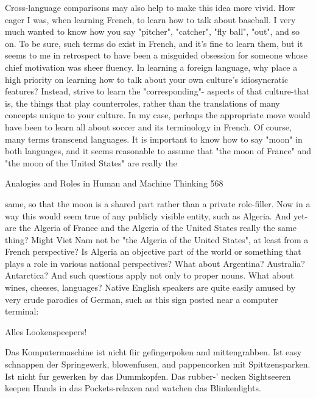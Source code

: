        Cross-language comparisons may also help to make this idea more vivid. How
eager I was, when learning French, to learn how to talk about baseball. I very much
wanted to know how you say "pitcher", "catcher", "fly ball", "out", and so on. To be
sure, such terms do exist in French, and it's fine to learn them, but it seems to me in
retrospect to have been a misguided obsession for someone whose chief motivation
was sheer fluency. In learning a foreign language, why place a high priority on
learning how to talk about your own culture's idiosyncratic features? Instead, strive to
learn the "corresponding"- aspects of that culture-that is, the things that play
counterroles, rather than the translations of many concepts unique to your culture. In
my case, perhaps the appropriate move would have been to learn all about soccer and
its terminology in French.
        Of course, many terms transcend languages. It is important to know how to
say "moon" in both languages, and it seems reasonable to assume that "the moon of
France" and "the moon of the United States" are really the




Analogies and Roles in Human and Machine Thinking                                      568

same, so that the moon is a shared part rather than a private role-filler. Now in a way
this would seem true of any publicly visible entity, such as Algeria. And yet-are the
Algeria of France and the Algeria of the United States really the same thing? Might
Viet Nam not be "the Algeria of the United States", at least from a French
perspective? Is Algeria an objective part of the world or something that plays a role in
various national perspectives? What about Argentina? Australia? Antarctica? And
such questions apply not only to proper nouns. What about wines, cheeses,
languages?
       Native English speakers are quite easily amused by very crude parodies of
German, such as this sign posted near a computer terminal:

                               Alles Lookenspeepers!

  Das Komputermaschine ist nicht fiir gefingerpoken and mittengrabben. Ist easy
  schnappen der Springewerk, blowenfusen, and pappencorken mit
  Spittzensparken. Ist nicht fur gewerken by das Dummkopfen. Das rubber-'
  necken Sightseeren keepen Hands in das Pockets-relaxen and watchen das
  Blinkenlights.


